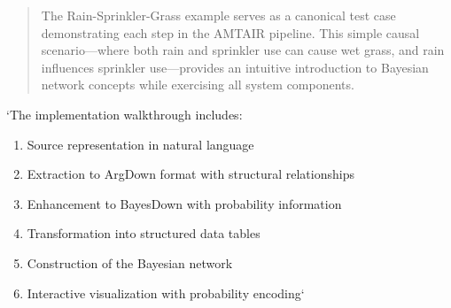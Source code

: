 \documentclass[12pt,a4paper]{report}
\providecommand{\tightlist}{%
  \setlength{\itemsep}{0pt}\setlength{\parskip}{0pt}}
\begin{document}
\begin{quote}
The Rain-Sprinkler-Grass example serves as a canonical test case
demonstrating each step in the AMTAIR pipeline. This simple causal
scenario---where both rain and sprinkler use can cause wet grass, and
rain influences sprinkler use---provides an intuitive introduction to
Bayesian network concepts while exercising all system components.
\end{quote}

`The implementation walkthrough includes:

\begin{enumerate}
\def\labelenumi{\arabic{enumi}.}
\tightlist
\item
  Source representation in natural language
\item
  Extraction to ArgDown format with structural relationships
\item
  Enhancement to BayesDown with probability information
\item
  Transformation into structured data tables
\item
  Construction of the Bayesian network
\item
  Interactive visualization with probability encoding`
\end{enumerate}

\begin{Shaded}
\begin{Highlighting}[]
\OperatorTok{=}
    
\OperatorTok{=}\NormalTok{ row[}\NormalTok{]}
\OperatorTok{=}\NormalTok{ row[}\NormalTok{]}
        
\OperatorTok{=}
\OperatorTok{=}
        
\OperatorTok{=}
\OperatorTok{=}
\OperatorTok{=}
\OperatorTok{=}
\NormalTok{        )}
    
\end{Highlighting}
\end{Shaded}
\end{document}
